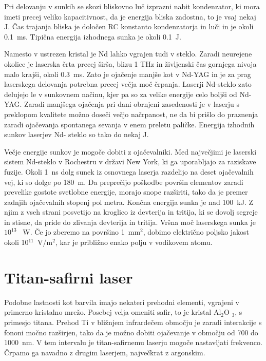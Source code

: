 Pri delovanju v sunkih se skozi bliskovno luč izprazni nabit kondenzator,
ki mora imeti precej veliko kapacitivnost, da je energija bliska zadostna,
to je vsaj nekaj J. Čas trajanja bliska je določen RC konstanto
kondenzatorja in luči in je okoli 0.1~ms. Tipična energija izhodnega sunka
je okoli 0.1~J.

Namesto v ustrezen kristal je Nd lahko vgrajen tudi v steklo. Zaradi
neurejene okolice je laserska črta precej širša, blizu 1 THz in
življenski čas gornjega nivoja malo krajši, okoli 0.3~ms. Zato je
ojačenje manjše kot v Nd-YAG in je za prag laserskega delovanja potrebna
precej večja moč črpanja. Laserji Nd-steklo zato delujejo le v sunkovnem
načinu, kjer pa so za velike energije celo boljši od Nd-YAG. Zaradi
manjšega ojačenja pri dani obrnjeni zasedenosti je v laserju s preklopom
kvalitete možno doseči večjo načrpanost, ne da bi prišlo do praznenja
zaradi ojačevanja spontanega sevanja v enem preletu paličke. Energija
izhodnih sunkov laserjev Nd- steklo so tako do nekaj J.

Večje energije sunkov je mogoče dobiti z ojačevalniki. Med največjimi je
laserski sistem Nd-steklo v Rochestru v državi New York, ki ga uporabljajo
za raziskave fuzije. Okoli 1~ns dolg sunek iz osnovnega laserja razdelijo na
deset ojačevalnih vej, ki so dolge po 180~m. Da preprečijo poškodbe
površin elementov zaradi prevelike gostote svetlobne energije, morajo snope
razširiti, tako da je premer zadnjih ojačevalnih stopenj pol metra.
Končna energija sunka je nad 100~kJ. Z njim z vseh strani posvetijo na
kroglico iz devterija in tritija, ki se dovolj segreje in stisne, da pride
do zlivanja devterija in tritija. Vršna moč laserskega sunka je $10^{13}$%
~W. Če jo zberemo na površino 1~mm$^2$, dobimo električno poljsko jakost
okoli 10$^{11}$~V/m$^2$, kar je približno enako polju v vodikovem atomu.


\section{Titan-safirni laser}

Podobne lastnosti kot barvila imajo nekateri prehodni elementi, vgrajeni v
primerno kristalno mrežo. Posebej velja omeniti safir, to je kristal Al$_2$O%
$_3$, s primesjo titana. Prehod Ti v bližnjem infrardečem območju je
zaradi interakcije s fononi močno razširjen, tako da je možno dobiti
ojačevanje v območju od 700 do 1000~nm. V tem intervalu je titan-safirnemu
laserju mogoče nastavljati frekvenco. Črpamo ga navadno z drugim laserjem,
največkrat z argonskim.

